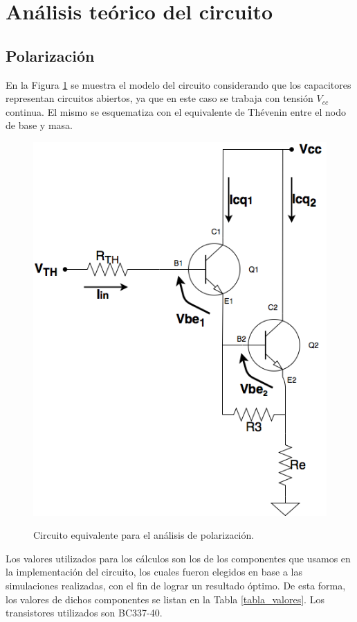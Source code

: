 
\section{Análisis teórico del circuito}



	\subsection{Polarizaci\'on}
		En la Figura \ref{polarizacion} se muestra el modelo del circuito considerando que los capacitores representan circuitos abiertos, ya que en este caso se trabaja con tensión $V_{cc}$ continua. El mismo se esquematiza con el equivalente de Th\'evenin entre el nodo de base y masa.\\
		\begin{figure}[H]
			\centering
			\includegraphics[scale=0.4]{./Imagenes/polarizacion.png} \\
			\caption{Circuito equivalente para el an\'alisis de polarizaci\'on.}
			\label{polarizacion}
		\end{figure}

Los valores utilizados para los cálculos son los de los componentes que usamos en la implementación del circuito, los cuales fueron elegidos en base a las simulaciones realizadas, con el fin de lograr un resultado óptimo. De esta forma, los valores de dichos componentes se listan en la Tabla \ref{tabla_valores}. Los transistores utilizados son BC337-40.


